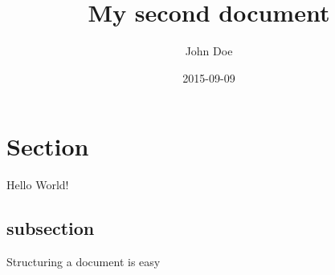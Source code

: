 \documentclass{article}
\title{My second document}
\date{2015-09-09}
\author{John Doe}
\begin{document}
	\maketitle
	\newpage
	\section{Section}
	Hello World!
	\subsection{subsection}
	Structuring a document is easy
\end{document}
